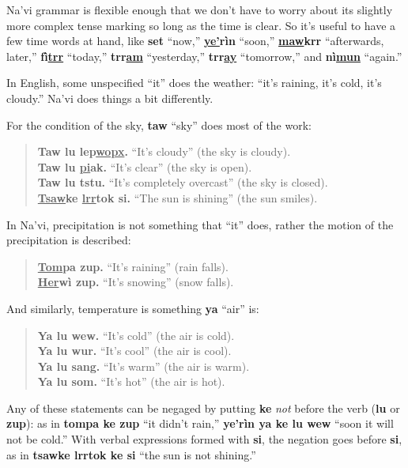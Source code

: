 \documentclass[nofonts]{tufte-handout}
\newcommand{\N}[1]{\textbf{\textcolor{navi}{#1}}}
\begin{document}
\bigskip
Na'vi grammar is flexible enough that we don't have to worry about its
slightly more complex tense marking so long as the time is clear.  So
it's useful to have a few time words at hand, like \N{set} ``now,''
\N{\uline{ye'}rìn} ``soon,'' \N{\uline{maw}krr} ``afterwards, later,''
\N{fì\uline{trr}} ``today,'' \N{trr\uline{am}} ``yesterday,''
\N{trr\uline{ay}} ``tomorrow,'' and \N{nì\uline{mun}} ``again.''

In English, some unspecified ``it'' does the weather: ``it's raining,
it's cold, it's cloudy.''  Na'vi does things a bit differently.

For the condition of the sky, \N{taw} ``sky'' does most of the work:

\begin{quotation}
\noindent\N{Taw lu lep\uline{wopx}.} ``It's cloudy'' (the sky is cloudy).\\
\noindent\N{Taw lu \uline{pi}ak.} ``It's clear'' (the sky is open). \\
\noindent\N{Taw lu tstu.} ``It's completely overcast'' (the sky is closed).\\
\noindent\N{\uline{Tsaw}ke \uline{lrr}tok si.} ``The sun is shining'' (the sun smiles).
\end{quotation}

In Na'vi, precipitation is not something that ``it'' does, rather the
motion of the precipitation is described:

\begin{quotation}
\noindent\N{\uline{Tom}pa zup.} ``It's raining'' (rain falls).\\
\noindent\N{\uline{Her}wì zup.} ``It's snowing'' (snow falls).
\end{quotation}

And similarly, temperature is something \N{ya} ``air'' is:

\begin{quotation}
\noindent\N{Ya lu wew.} ``It's cold'' (the air is cold). \\
\noindent\N{Ya lu wur.} ``It's cool'' (the air is cool). \\
\noindent\N{Ya lu sang.} ``It's warm'' (the air is warm). \\
\noindent\N{Ya lu som.} ``It's hot'' (the air is hot).
\end{quotation}

Any of these statements can be negaged by putting \N{ke} \textit{not}
before the verb (\N{lu} or \N{zup}): as in \N{tompa ke zup} ``it
didn't rain,'' \N{ye'rìn ya ke lu wew} ``soon it will not be cold.''
With verbal expressions formed with \N{si}, the negation goes before
\N{si}, as in \N{tsawke lrrtok ke si} ``the sun is not shining.''
\end{document}
